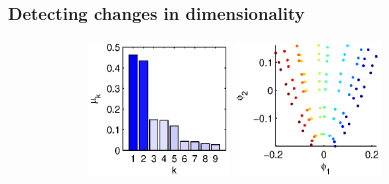 \documentclass[preprint]{elsarticle}
\begin{document}
\subsubsection{Detecting changes in dimensionality}

\begin{figure}
%
\def\figheight{1.4in}
%
\begin{subfigure}[t]{0.31\textwidth}
\centering
\includegraphics[height=\figheight]{chemotaxis1_evals}
\includegraphics[height=\figheight]{chemotaxis1_embed_good}
\vspace{1.2in}
\caption{}
\end{subfigure}
%

\end{figure}
\end{document}
